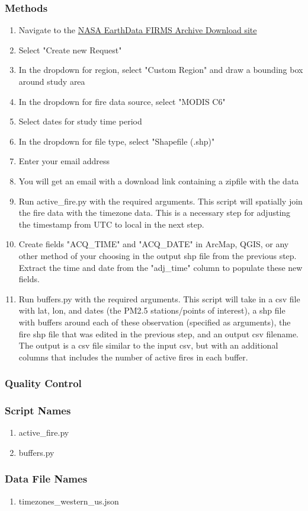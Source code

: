 \subsubsection*{Methods}
\begin{enumerate}
\item Navigate to the \href{https://firms.modaps.eosdis.nasa.gov/download/}{NASA EarthData FIRMS Archive Download site}
\item Select "Create new Request"
\item In the dropdown for region, select "Custom Region" and draw a bounding box around study area
\item In the dropdown for fire data source, select "MODIS C6"
\item Select dates for study time period
\item In the dropdown for file type, select "Shapefile (.shp)"
\item Enter your email address
\item You will get an email with a download link containing a zipfile with the data
\item Run active\_fire.py with the required arguments. This script will spatially join the fire data with the timezone data. This is a necessary step for adjusting the timestamp from UTC to local in the next step.
\item Create fields "ACQ\_TIME" and "ACQ\_DATE" in ArcMap, QGIS, or any other method of your choosing in the output shp file from the previous step. Extract the time and date from the "adj\_time" column to populate these new fields. 
\item Run buffers.py with the required arguments. This script will take in a csv file with lat, lon, and dates (the PM2.5 stations/points of interest), a shp file with buffers around each of these observation (specified as arguments), the fire shp file that was edited in the previous step, and an output csv filename. The output is a csv file similar to the input csv, but with an additional columns that includes the number of active fires in each buffer.
\end{enumerate}
\subsubsection*{Quality Control}
\subsubsection*{Script Names}
\begin{enumerate}
\item active\_fire.py
\item buffers.py
\end{enumerate}
\subsubsection*{Data File Names}
\begin{enumerate}
\item timezones\_western\_us.json
\end{enumerate}